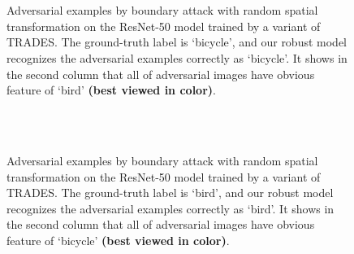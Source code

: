 \documentclass[11pt]{article}
\newcommand{\0}{\mathbf{0}}
\newcommand{\1}{\mathbf{1}}
\begin{document}
\begin{figure}[htbp]
\centering
	\\
	\\
	\caption{Adversarial examples by boundary attack with random spatial transformation on the ResNet-50 model trained by a variant of TRADES. The ground-truth label is `bicycle', and our robust model recognizes the adversarial examples correctly as `bicycle'. It shows in the second column that all of adversarial images have obvious feature of `bird' \textbf{(best viewed in color)}.}
	\label{figure: interpretability bike}
\end{figure}

\begin{figure}[htbp]
\centering
	\\
	\\
	\caption{Adversarial examples by boundary attack with random spatial transformation on the ResNet-50 model trained by a variant of TRADES. The ground-truth label is `bird', and our robust model recognizes the adversarial examples correctly as `bird'. It shows in the second column that all of adversarial images have obvious feature of `bicycle' \textbf{(best viewed in color)}.}
	\label{figure: interpretability bird}
\end{figure}
\end{document}
